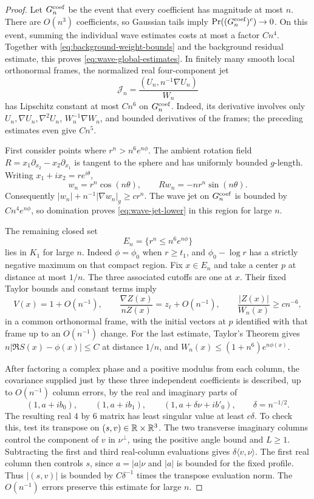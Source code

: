\begin{proof}
Let $G_n^{\rm coef}$ be the event that every coefficient has magnitude
at most $n$.  There are $O(n^3)$ coefficients, so Gaussian tails imply
$\Pr((G_n^{\rm coef})^c)\to0$.  On this event, summing the individual
wave estimates costs at most a factor $Cn^4$.  Together with
\eqref{eq:background-weight-bounds} and the background residual
estimate, this proves \eqref{eq:wave-global-estimates}.
In finitely many smooth local orthonormal frames, the normalized real
four-component jet
\[
 \mathcal J_n=\frac{(U_n,n^{-1}\nabla U_n)}{W_n}
\]
has Lipschitz constant at most $Cn^6$ on $G_n^{\rm coef}$.  Indeed,
its derivative involves only $U_n,\nabla U_n,\nabla^2U_n$,
$W_n^{-1}\nabla W_n$, and bounded derivatives of the frames;
the preceding estimates even give $Cn^5$.

First consider points where $r^n>n^6e^{n\phi}$.  The ambient rotation
field $R=x_1\partial_{x_2}-x_2\partial_{x_1}$ is tangent to the sphere
and has uniformly bounded $g$-length.  Writing $x_1+ix_2=re^{i\theta}$,
\[
 w_n=r^n\cos(n\theta),\qquad
 Rw_n=-nr^n\sin(n\theta).
\]
Consequently $|w_n|+n^{-1}|\nabla w_n|_g\ge c r^n$.  The wave jet
on $G_n^{\rm coef}$ is bounded by $Cn^4e^{n\phi}$, so domination
proves \eqref{eq:wave-jet-lower} in this region for large $n$.

The remaining closed set
\[
 E_n=\{r^n\le n^6e^{n\phi}\}
\]
lies in $K_1$ for large $n$.  Indeed $\phi=\phi_0$ when $r\ge t_1$,
and $\phi_0-\log r$ has a strictly negative maximum on that compact
region.  Fix $x\in E_n$ and take a center $p$ at distance at most
$1/n$.  The three associated cutoffs are one at $x$.  Their fixed
Taylor bounds and constant terms imply
\[
 V(x)=1+O(n^{-1}),\qquad
 \frac{\nabla Z(x)}{nZ(x)}=z_\ell+O(n^{-1}),\qquad
 \frac{|Z(x)|}{W_n(x)}\ge c n^{-6},
\]
in a common orthonormal frame, with the initial vectors at $p$
identified with that frame up to an $O(n^{-1})$ change.
For the last estimate, Taylor's Theorem gives
$n|\Re S(x)-\phi(x)|\le C$ at distance $1/n$, and
$W_n(x)\le(1+n^6)e^{n\phi(x)}$.

After factoring a complex phase and a positive modulus from each
column, the covariance supplied just by these three independent
coefficients is described, up to $O(n^{-1})$ column errors, by the
real and imaginary parts of
\[
 (1,a+ib_0),\qquad (1,a+ib_1),\qquad
 (1,a+\delta\nu+ib'_0),\qquad \delta=n^{-1/2}.
\]
The resulting real $4$ by $6$ matrix has least singular value at least
$c\delta$.  To check this, test its transpose on $(s,v)\in\mathbb R\times\mathbb R^3$.
The two transverse imaginary columns control the component of $v$
in $\nu^\perp$, using the positive angle bound and $L\ge1$.
Subtracting the first and third real-column evaluations gives
$\delta\langle v,\nu\rangle$.  The first real column then controls
$s$, since $a=|a|\nu$ and $|a|$ is bounded for the fixed profile.
Thus $|(s,v)|$ is bounded by $C\delta^{-1}$ times the transpose
evaluation norm.  The $O(n^{-1})$ errors preserve this estimate for
large $n$.


\end{proof}
